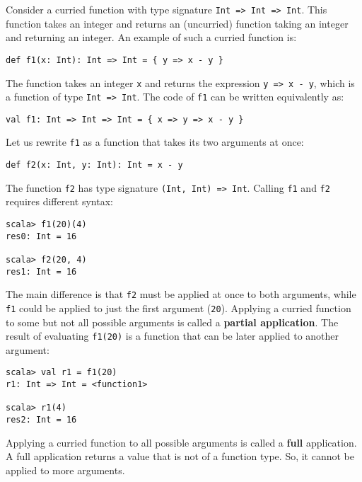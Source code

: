 Consider a curried function with type signature \lstinline!Int => Int => Int!.
This function takes an integer and returns an (uncurried) function
taking an integer and returning an integer. An example of such a curried
function is:
\begin{lstlisting}
def f1(x: Int): Int => Int = { y => x - y }
\end{lstlisting}

The function takes an integer \lstinline!x! and returns the expression
\lstinline!y => x - y!, which is a function of type \lstinline!Int => Int!.
The code of \lstinline!f1! can be written equivalently as:
\begin{lstlisting}
val f1: Int => Int => Int = { x => y => x - y }
\end{lstlisting}
Let us rewrite \lstinline!f1! as a function that takes its two arguments
at once:
\begin{lstlisting}
def f2(x: Int, y: Int): Int = x - y
\end{lstlisting}
The function \lstinline!f2! has type signature \lstinline!(Int, Int) => Int!.
Calling \lstinline!f1! and \lstinline!f2! requires different syntax:
\begin{lstlisting}
scala> f1(20)(4)
res0: Int = 16

scala> f2(20, 4)
res1: Int = 16
\end{lstlisting}
The main difference is that \lstinline!f2! must be applied at once
to both arguments, while \lstinline!f1! could be applied to just
the first argument (\lstinline!20!). Applying a curried function
to some but not all possible arguments is called a \textbf{partial
application}. The result of evaluating \lstinline!f1(20)! is a function
that can be later applied to another argument:
\begin{lstlisting}
scala> val r1 = f1(20)
r1: Int => Int = <function1> 

scala> r1(4)
res2: Int = 16
\end{lstlisting}

Applying a curried function to all possible arguments is called a
\textbf{full} application.
A full application returns a value that is not of a function type.
So, it cannot be applied to more arguments.

